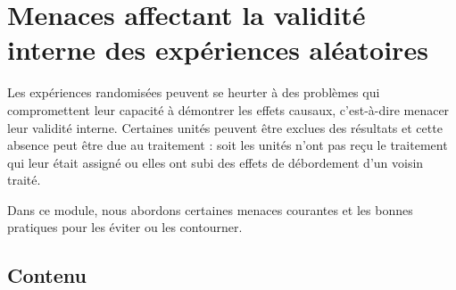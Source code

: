 \documentclass[12pt,]{book}
\begin{document}
\hypertarget{menaces-affectant-la-validituxe9-interne-des-expuxe9riences-aluxe9atoires}{%
\chapter{Menaces affectant la validité interne des expériences aléatoires}\label{menaces-affectant-la-validituxe9-interne-des-expuxe9riences-aluxe9atoires}}

Les expériences randomisées peuvent se heurter à des problèmes qui compromettent leur capacité à démontrer les effets causaux, c'est-à-dire menacer leur validité interne.
Certaines unités peuvent être exclues des résultats et cette absence peut être due au traitement : soit les unités n'ont pas reçu le traitement qui leur était assigné ou elles ont subi des effets de débordement d'un voisin traité.

Dans ce module, nous abordons certaines menaces courantes et les bonnes pratiques pour les éviter ou les contourner.

\hypertarget{contenu-7}{%
\section{Contenu}\label{contenu-7}}
\end{document}
